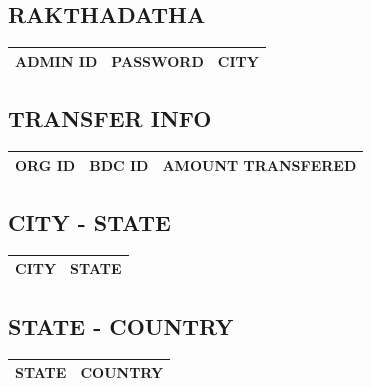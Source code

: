 \begin{sloppypar}
\subsection{RAKTHADATHA}

\begin{tabular}{ | c | c | c | }
 \hline
 ADMIN ID & PASSWORD & CITY \\
 \hline
\end{tabular}

\subsection{TRANSFER INFO}

\begin{tabular}{ | c | c | c |}
 \hline
 ORG ID & BDC ID & AMOUNT TRANSFERED \\
 \hline
\end{tabular}

\subsection{CITY - STATE}

\begin{tabular}{ | c | c | }
 \hline
 CITY & STATE \\
 \hline
\end{tabular}

\subsection{STATE - COUNTRY}

\begin{tabular}{ | c | c | }
 \hline
 STATE & COUNTRY \\
 \hline
\end{tabular}
\end{sloppypar}

